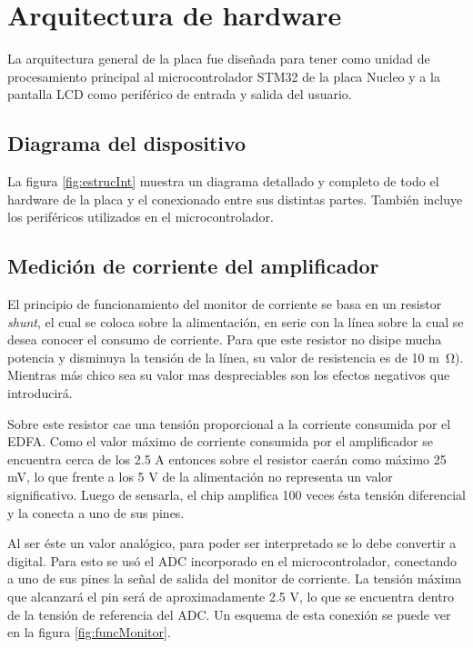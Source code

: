 \section{Arquitectura de hardware}

La arquitectura general de la placa fue diseñada para tener como unidad de procesamiento principal al microcontrolador STM32 de la placa Nucleo y a la pantalla LCD como periférico de entrada y salida del usuario.

\subsection{Diagrama del dispositivo}

La figura \ref{fig:estrucInt} muestra un diagrama detallado y completo de todo el hardware de la placa y el conexionado entre sus distintas partes. También incluye los periféricos utilizados en el microcontrolador.


\subsection{Medición de corriente del amplificador}

El principio de funcionamiento del monitor de corriente se basa en un resistor \textit{shunt}, el cual se coloca sobre la alimentación, en serie con la línea sobre la cual se desea conocer el consumo de corriente. Para que este resistor no disipe mucha potencia y disminuya la tensión de la línea, su valor de resistencia es de 10 \si{m\ohm}). Mientras más chico sea su valor mas despreciables son los efectos negativos que introducirá.

Sobre este resistor cae una tensión proporcional a la corriente consumida por el EDFA. Como el valor máximo de corriente consumida por el amplificador se encuentra cerca de los 2.5 A entonces sobre el resistor caerán como máximo 25 mV, lo que frente a los 5 V de la alimentación no representa un valor significativo. Luego de sensarla, el chip amplifica 100 veces ésta tensión diferencial y la conecta a uno de sus pines.

Al ser éste un valor analógico, para poder ser interpretado se lo debe convertir a digital. Para esto se usó el ADC incorporado en el microcontrolador, conectando a uno de sus pines la señal de salida del monitor de corriente. La tensión máxima que alcanzará el pin será de aproximadamente 2.5 V, lo que se encuentra dentro de la tensión de referencia del ADC. Un esquema de esta conexión se puede ver en la figura \ref{fig:funcMonitor}.

